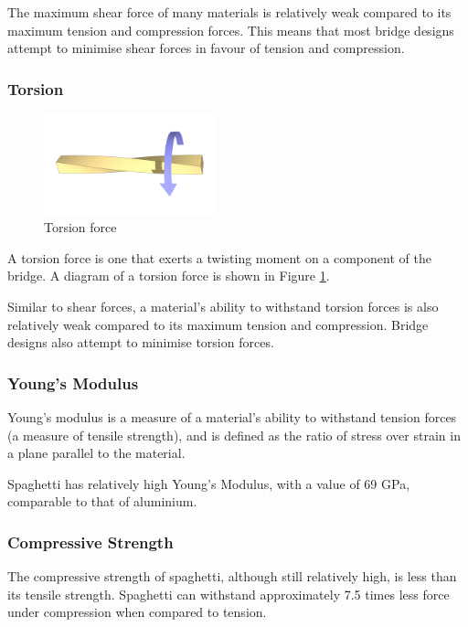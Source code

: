 \documentclass[a4paper,11pt]{article}
\begin{document}
The maximum shear force of many materials is relatively weak compared to its
maximum tension and compression forces.
This means that most bridge designs attempt to minimise shear forces in favour
of tension and compression.


\subsubsection{Torsion}

\begin{figure}
\begin{center}
\includegraphics[width=5cm]{figures/torsion.png}
\end{center}
\caption{Torsion force}
\label{research:torsion}
\end{figure}

A torsion force is one that exerts a twisting moment on a component of the
bridge.
A diagram of a torsion force is shown in Figure \ref{research:torsion}.

Similar to shear forces, a material's ability to withstand torsion forces is
also relatively weak compared to its maximum tension and compression.
Bridge designs also attempt to minimise torsion forces.


\subsubsection{Young's Modulus}

Young's modulus is a measure of a material's ability to withstand tension forces
(a measure of tensile strength), and is defined as the ratio of stress over
strain in a plane parallel to the material.

Spaghetti has relatively high Young's Modulus, with a value of 69 GPa,
comparable to that of aluminium.


\subsubsection{Compressive Strength}

The compressive strength of spaghetti, although still relatively high, is
less than its tensile strength.
Spaghetti can withstand approximately 7.5 times less force under compression
when compared to tension.
\end{document}
